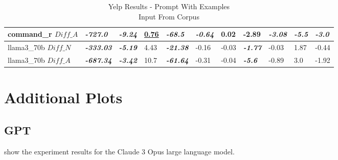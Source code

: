 \documentclass[11pt]{article}
\begin{document}
\begin{table}[!ht]
{\begin{tabular}{lllllllllll}
            command\_r $Diff\_A$  & \textbf{\textit{-727.0}}  & \textbf{\textit{-9.24}} & \textbf{\underline{0.76}} & \textbf{\textit{-68.5}}  & \textbf{\textit{-0.64}} & 0.02        & -2.89                   & \textbf{\textit{-3.08}} & \textbf{\textit{-5.5}}  & \textbf{\textit{-3.0}}  \\ \midrule
            llama3\_70b $Diff\_N$ & \textbf{\textit{-333.03}} & \textbf{\textit{-5.19}} & 4.43                      & \textbf{\textit{-21.38}} & -0.16                   & -0.03       & \textbf{\textit{-1.77}} & -0.03                   & 1.87                    & -0.44                   \\ \midrule
            llama3\_70b $Diff\_A$ & \textbf{\textit{-687.34}} & \textbf{\textit{-3.42}} & 10.7                      & \textbf{\textit{-61.64}} & -0.31                   & -0.04       & \textbf{\textit{-5.6}}  & -0.89                   & 3.0                     & -1.92                   \\ \bottomrule
        \end{tabular}%
    }
    \caption{Yelp Results - Prompt With Examples\\Input From Corpus}\label{table-prompt-2-ifd-yelp}
\end{table}

\section{Additional Plots}

\subsection{GPT}

show the experiment results for the Claude 3 Opus large language model.
\end{document}
